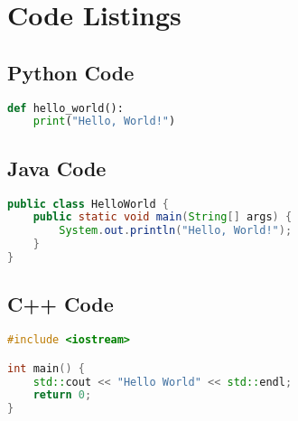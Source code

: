 \begingroup
\raggedright
\section{Code Listings}


\subsection{Python Code}
\begin{lstlisting}[language=Python, caption=Python Example]
def hello_world():
    print("Hello, World!")
\end{lstlisting}


\subsection{Java Code}
\begin{lstlisting}[language=Java, caption=Java Example, basicstyle=\ttfamily]
public class HelloWorld {
    public static void main(String[] args) {
        System.out.println("Hello, World!");
    }
}
\end{lstlisting}

\subsection{C++ Code}
\begin{lstlisting}[language=C++, caption=C++ Example, basicstyle=\ttfamily]
#include <iostream>

int main() {
    std::cout << "Hello World" << std::endl;
    return 0;
}
\end{lstlisting}

\endgroup
